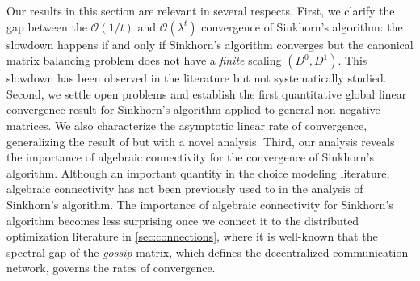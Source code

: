 Our results in this section are relevant in several respects. First, we clarify the gap between the $\mathcal O(1/t)$ and $\mathcal O(\lambda^t)$ convergence of Sinkhorn's algorithm: the slowdown happens if and only if Sinkhorn's algorithm converges but the canonical matrix balancing problem does not have a \emph{finite} scaling $(D^0,D^1)$. This slowdown has been observed in the literature but not systematically studied. Second, 
 we settle open problems and establish the first quantitative global linear convergence result for Sinkhorn's algorithm applied to general non-negative matrices. We also characterize the asymptotic linear rate of convergence, generalizing the result of \citet{knight2008sinkhorn} but with a novel analysis. 
  Third, our analysis reveals the importance of algebraic connectivity for the convergence of Sinkhorn's algorithm. Although an important quantity in the choice modeling literature, algebraic connectivity has not been previously used to in the analysis of Sinkhorn's algorithm. The importance of algebraic connectivity for Sinkhorn's algorithm becomes less surprising once we connect it to the distributed optimization literature in \cref{sec:connections}, where it is well-known that the spectral gap of the \emph{gossip} matrix, which defines the decentralized communication network, governs the rates of convergence.